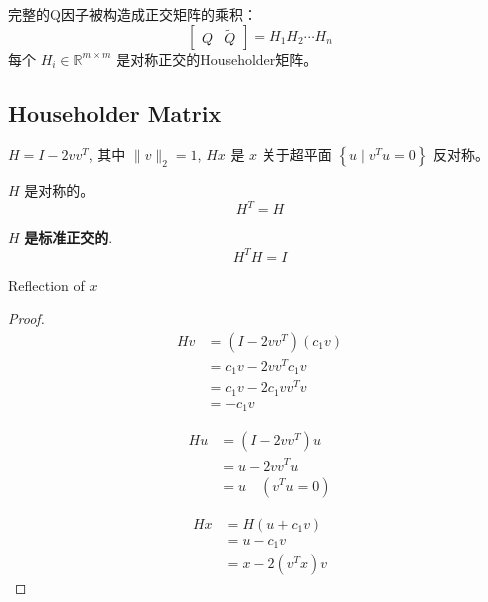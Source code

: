 完整的Q因子被构造成正交矩阵的乘积：
$$
\left[\begin{array}{ll}
Q & \tilde{Q}
\end{array}\right]=H_{1} H_{2} \cdots H_{n}
$$
每个 $ H_{i} \in \mathbb{R}^{m \times m} $ 是对称正交的Householder矩阵。



\subsection{Householder Matrix}

\begin{theorem}
    $ H=I-2 v v^{T} $, 其中 $ \|v\|_{2}=1 $, $ H x $ 是 $ x $ 关于超平面 $ \left\{u \mid v^{T} u=0\right\} $ 反对称。
\end{theorem}

\begin{theorem}
    $ H $ 是对称的。
    $$ H^{T}=H $$
\end{theorem}
    
\begin{theorem}
    $ H $ \textbf{是标准正交的}.
$$ H^{T} H=I $$
\end{theorem}

\begin{FigureCenter}{Reflection of $x$}
    
\end{FigureCenter}



\begin{proof}
    $$\begin{aligned}
        Hv &= (I-2 v v^{T}) (c_1 v) \\
        &= c_1 v - 2 v v^T c_1 v \\
        & = c_1 v - 2 c_1 v v^T v \\
        & = -c_1 v
    \end{aligned}$$

    $$\begin{aligned}
        Hu &= (I - 2 v v^T) u \\
        &= u - 2 v v^T u \\
        & = u \quad (v^T u = 0) 
    \end{aligned}$$

    $$\begin{aligned}
        Hx &= H(u + c_1v) \\
        &= u - c_1 v \\
        &= x - 2(v^Tx)v
    \end{aligned}$$
\end{proof}


